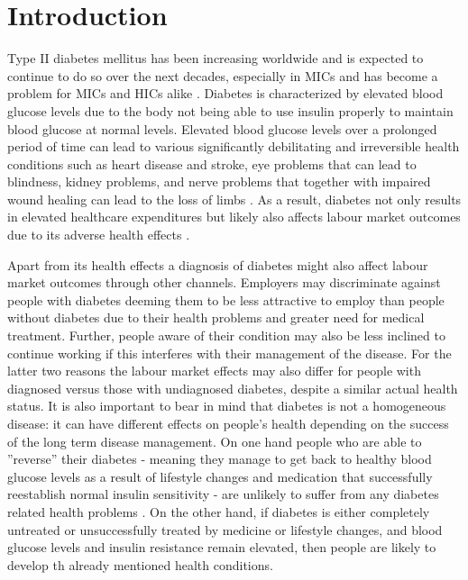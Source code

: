 \section{\label{sec:Introduction}Introduction}

Type II diabetes mellitus has been increasing worldwide and is expected to continue to do so over the next decades, especially in \ac{MICs} and has become a problem for \ac{MICs} and \ac{HICs} alike  \citep{InternationalDiabetesFederation2013}. Diabetes is characterized by elevated blood glucose levels due to the body not being able to use insulin properly to maintain blood glucose at normal levels. Elevated blood glucose levels over a prolonged period of time can lead to various significantly debilitating and irreversible health conditions such as heart disease and stroke, eye problems that can lead to blindness, kidney problems, and nerve problems that together with impaired wound healing can lead to the loss of limbs \citep{Reynoso-Noveron2011}. As a result, diabetes not only results in elevated healthcare expenditures but likely also affects labour market outcomes due to its adverse health effects \citep{Seuring2015a}. 

Apart from its health effects a diagnosis of diabetes might also affect labour market outcomes through other channels. Employers may discriminate against
people with diabetes deeming them to be less attractive to employ
than people without diabetes due to their health problems and greater
need for medical treatment. Further, people aware of their condition
may also be less inclined to continue working if this interferes with
their management of the disease. For the latter two reasons the labour
market effects may also differ for people with diagnosed versus those
with undiagnosed diabetes, despite a similar actual health status.
It is also important to bear in mind that diabetes is not a homogeneous
disease: it can have different effects on people's health depending
on the success of the long term disease management. On one hand people
who are able to ''reverse'' their diabetes - meaning they manage
to get back to healthy blood glucose levels as a result of lifestyle
changes and medication that successfully reestablish normal insulin sensitivity -
are unlikely to suffer from any diabetes related health problems \citep{Lim2011,Gregg2012}.
On the other hand, if diabetes is either completely untreated or unsuccessfully
treated by medicine or lifestyle changes, and blood glucose levels
and insulin resistance remain elevated, then people are likely to develop th already mentioned health conditions.

